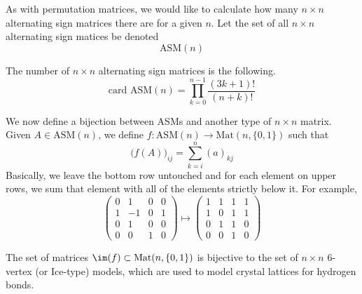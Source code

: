   As with permutation matrices, we would like to calculate how many $n \times n$ alternating sign matrices there are for a given $n$. Let the set of all $n \times n$ alternating sign matices be denoted
  \[\text{ASM}(n)\]

  \begin{proposition}
  The number of $n \times n$ alternating sign matrices is the following. 
  \[\text{card ASM}(n) = \prod_{k=0}^{n-1} \frac{(3k+1)!}{(n+k)!}\]
  \end{proposition}

  We now define a bijection between ASMs and another type of $n \times n$ matrix. Given $A \in \text{ASM}(n)$, we define $f: \text{ASM}(n) \longrightarrow \text{Mat}(n, \{0,1\})$ such that
  \[\big(f(A)\big)_{ij} = \sum_{k=i}^n (a)_{kj}\]
  Basically, we leave the bottom row untouched and for each element on upper rows, we sum that element with all of the elements strictly below it. For example, 
  \[\begin{pmatrix}
  0&1&0&0\\1&-1&0&1\\0&1&0&0\\0&0&1&0
  \end{pmatrix} \mapsto \begin{pmatrix}
  1&1&1&1\\1&0&1&1\\0&1&1&0\\0&0&1&0
  \end{pmatrix}\]

  \begin{theorem}
  The set of matrices $\im(f) \subset \text{Mat}(n, \{0, 1\})$ is bijective to the set of $n \times n$ 6-vertex (or Ice-type) models, which are used to model crystal lattices for hydrogen bonds. 
  \end{theorem}

